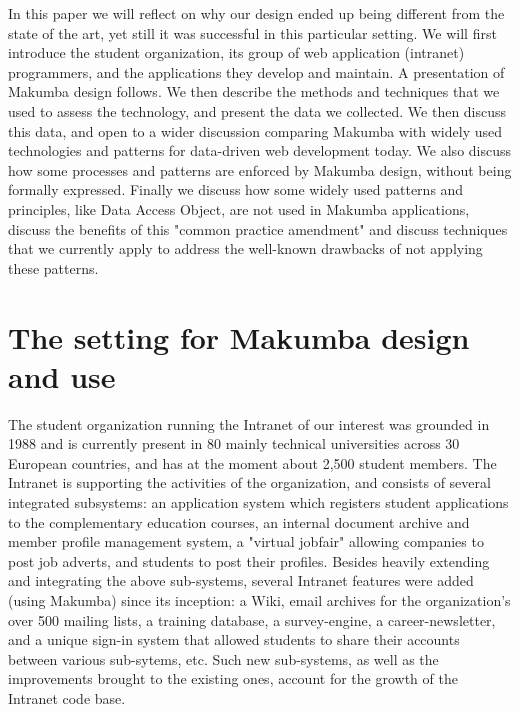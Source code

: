 \documentclass{llncs}
\begin{document}
In this paper we will  reflect on why our design ended up being different from the state of the art, yet still it was successful in this particular setting. We will first introduce the student organization, its group of web application (intranet) programmers, and the applications they develop and maintain. A presentation of Makumba design follows. We then describe the methods and techniques that we used to assess the technology, and present the data we collected. We then discuss this data, and open to  a wider discussion comparing Makumba with widely used technologies and patterns for data-driven web development today. We also discuss how some processes and patterns are enforced by Makumba design, without being formally expressed. Finally we discuss how some widely used patterns and principles, like Data Access Object, are not used in Makumba applications, discuss the benefits of this "common practice amendment" and discuss techniques that we currently apply to address the well-known drawbacks of not applying these patterns.

\section{The setting for Makumba design and use}\label{sec:setting}
The student organization running the Intranet of our interest was grounded in 1988 and is currently present in 80 mainly technical universities across 30 European countries, and has at the moment about 2,500 student members. The Intranet is supporting the activities of the organization, and consists of several integrated subsystems: an application system which registers student applications to the complementary education courses, an internal document archive and member profile management system, a "virtual jobfair" allowing companies to post job adverts, and students to post their profiles. Besides heavily extending and integrating the above sub-systems, several Intranet features were added (using Makumba) since its inception: a Wiki, email archives for the organization's over 500 mailing lists, a training database, a survey-engine, a career-newsletter, and a unique sign-in system that allowed students to share their accounts between various sub-sytems, etc. Such new sub-systems, as well as the improvements brought to the existing ones, account for the growth of the Intranet code base.
\end{document}
